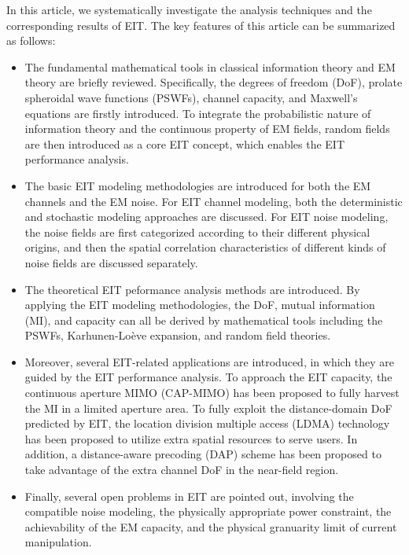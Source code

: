 \documentclass[journal,twocolumn]{IEEEtran}
\begin{document}
In this article, we systematically investigate the analysis techniques and the corresponding results of EIT. The key features of this article can be summarized as follows:
\begin{itemize}
\item{The fundamental mathematical tools in classical information theory and EM theory are briefly reviewed. Specifically, the degrees of freedom (DoF), prolate spheroidal wave functions (PSWFs), channel capacity, and Maxwell's equations are firstly introduced. To integrate the probabilistic nature of information theory and the continuous property of EM fields, random fields are then introduced as a core EIT concept, which enables the EIT performance analysis. }
\item{The basic EIT modeling methodologies are introduced for both the EM channels and the EM noise. For EIT channel modeling, both the deterministic and stochastic modeling approaches are discussed. For EIT noise modeling, the noise fields are first categorized according to their different physical origins, and then the spatial correlation characteristics of different kinds of noise fields are discussed separately. }
\item{The theoretical EIT peformance analysis methods are introduced. By applying the EIT modeling methodologies, the DoF, mutual information (MI), and capacity can all be derived by mathematical tools including the PSWFs, Karhunen-Lo\`{e}ve expansion, and random field theories. } 
\item Moreover, several EIT-related applications are introduced, in which they are guided by the EIT performance analysis. To approach the EIT capacity, the continuous aperture MIMO (CAP-MIMO) has been proposed to fully harvest the MI in a limited aperture area. To fully exploit the distance-domain DoF predicted by EIT, the location division multiple access (LDMA) technology has been proposed to utilize extra spatial resources to serve users. In addition, a distance-aware precoding (DAP) scheme has been proposed to take advantage of the extra channel DoF in the near-field region.  %
\item{Finally, several open problems in EIT are pointed out, involving the compatible noise modeling, the physically appropriate power constraint, the achievability of the EM capacity, and the physical granuarity limit of current manipulation.}
\end{itemize}
\end{document}
